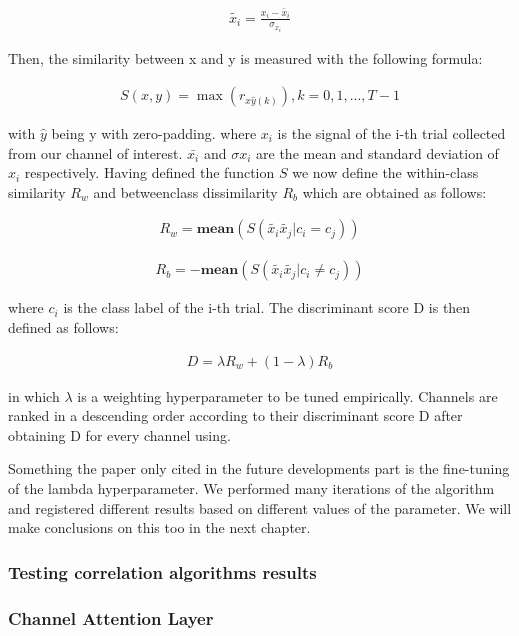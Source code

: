 \documentclass{Configuration_Files/PoliMi3i_thesis}
\begin{document}
\begin{align}
	\tilde{x_i} = \frac{x_i - \bar x_i}{\sigma_{x_i}}
   \label{eq:XCDC3}
\end{align}


Then, the similarity between x and y is measured with the following formula:

\begin{align}
	S(x,y) = \max(r_{x\hat{y}(k)}), k=0,1,..., T - 1 
   \label{eq:XCDC2}
\end{align}

with $\hat{y}$ being y with zero-padding.
where $x_i$ is the signal of the i-th trial collected from our channel of interest. $\bar{x_i}$ and $\sigma{x_i}$ are
the mean and standard deviation of $x_i$ respectively.
Having defined the function $S$ we now define the within-class similarity $R_w$ and betweenclass dissimilarity $R_b$ which are obtained as follows:

\begin{align}
	R_w = \mathbf{mean}(S(\tilde{x_i}\tilde{x_j}| c_i = c_j))
   \label{eq:XCDC4}
\end{align}

\begin{align}
	R_b = -\mathbf{mean}(S(\tilde{x_i}\tilde{x_j}| c_i \neq  c_j))
   \label{eq:XCDC5}
\end{align}

where $c_i$ is the class label of the i-th trial. The discriminant score D is then defined as follows:

\begin{align}
	D = \lambda R_w + (1-\lambda)R_b
   \label{eq:XCDC6}
\end{align}

in which $\lambda$ is a weighting hyperparameter to be tuned empirically.
Channels are ranked in a descending order according to their discriminant score D after obtaining D for every channel using.

Something the paper only cited in the future developments part is the fine-tuning of the lambda hyperparameter.
We performed many iterations of the algorithm and registered different results based on different values of the parameter.
We will make conclusions on this too in the next chapter.


\subsubsection{Testing correlation algorithms results}

\subsubsection{Channel Attention Layer}
\end{document}
